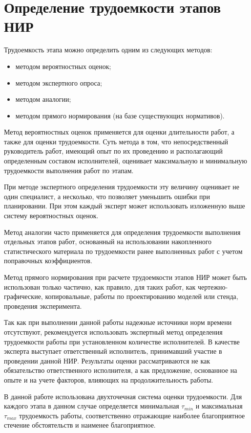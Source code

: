 \clearpage
\section{Определение трудоемкости этапов НИР}
Трудоемкость этапа можно определить одним из следующих методов:
\begin{itemize}
	\item методом вероятностных оценок;
	\item методом экспертного опроса;
	\item методом аналогии;
	\item методом прямого нормирования (на базе существующих нормативов).
\end{itemize}

Метод вероятностных оценок применяется для оценки длительности работ, а также для оценки трудоемкости. Суть метода в том, что непосредственный руководитель работ, имеющий опыт по их проведению и располагающий определенным составом исполнителей, оценивает максимальную и минимальную трудоемкости выполнения работ по этапам.

При методе экспертного определения трудоемкости эту величину оценивает не один специалист, а несколько, что позволяет уменьшить ошибки при планировании. При этом каждый эксперт может использовать изложенную выше систему вероятностных оценок.

Метод аналогии часто применяется для определения трудоемкости выполнения отдельных этапов работ, основанный на использовании накопленного статистического материала по трудоемкости ранее выполненных работ с учетом поправочных коэффициентов.

Метод прямого нормирования при расчете трудоемкости этапов НИР может быть использован только частично, как правило, для таких работ, как чертежно-графические, копировальные, работы по проектированию моделей или стенда, проведения эксперимента.

Так как при выполнении данной работы надежные источники норм времени отсутствуют, рекомендуется использовать экспертный метод определения трудоемкости работы при установленном количестве исполнителей. В качестве эксперта выступает ответственный исполнитель, принимавший участие в проведении данной НИР. Результаты оценки рассматриваются не как обязательство ответственного исполнителя, а как предложение, основанное на опыте и на учете факторов, влияющих на продолжительность работы.

В данной работе использована двухточечная система оценки трудоемкости. Для каждого этапа в данном случае определяется минимальная $\tau_{min}$ и максимальная $\tau_{max}$  трудоемкость работы, соответственно отражающие наиболее благоприятное стечение обстоятельств и наименее благоприятное.

